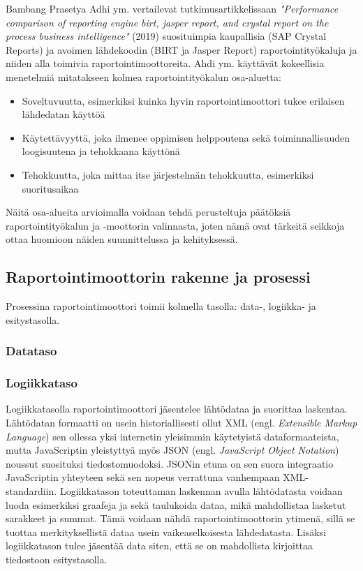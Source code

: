 Bambang Prasetya Adhi ym. vertailevat tutkimusartikkelissaan \textit{"Performance comparison of reporting engine birt, jasper report, and crystal report on the process business intelligence"} (2019)  \cite{adhi_performance_2019} suosituimpia kaupallisia (SAP Crystal Reports) ja avoimen lähdekoodin (BIRT ja Jasper Report) raportointityökaluja ja niiden alla toimivia raportointimoottoreita. Ahdi ym. käyttävät kokeellisia menetelmiä mitatakseen kolmea raportointityökalun osa-aluetta:
\begin{itemize}
\item Soveltuvuutta, esimerkiksi kuinka hyvin raportointimoottori tukee erilaisen lähdedatan käyttöä
\item Käytettävyyttä, joka ilmenee oppimisen helppoutena sekä toiminnallisuuden loogisuutena ja tehokkaana käyttönä
\item Tehokkuutta, joka mittaa itse järjestelmän tehokkuutta, esimerkiksi suoritusaikaa
\end{itemize}
Näitä osa-alueita arvioimalla voidaan tehdä perusteltuja päätöksiä raportointityökalun ja -moottorin valinnasta, joten nämä ovat tärkeitä seikkoja ottaa huomioon näiden suunnittelussa ja kehityksessä.

\subsection{Raportointimoottorin rakenne ja prosessi} \label{Raportointimoottorin rakenne ja prosessi}

Prosessina raportointimoottori toimii kolmella tasolla: data-, logiikka- ja esitystasolla. \cite{he_design_2010}

\subsubsection{Datataso}


\subsubsection{Logiikkataso}

Logiikkatasolla raportointimoottori jäsentelee lähtödataa ja suorittaa laskentaa. Lähtödatan formaatti on usein historiallisesti ollut XML (engl. \textit{Extensible Markup Language}) sen ollessa yksi internetin yleisimmin käytetyistä dataformaateista, mutta JavaScriptin yleistyttyä myös JSON (engl. \textit{JavaScript Object Notation}) noussut suosituksi tiedostomuodoksi. JSONin etuna on sen suora integraatio JavaScriptin yhteyteen sekä sen nopeus verrattuna vanhempaan XML-standardiin. \cite{nurseitov_comparison_nodate} Logiikkatason toteuttaman laskennan avulla lähtödatasta voidaan luoda esimerkiksi graafeja ja sekä taulukoida dataa, mikä mahdollistaa lasketut sarakkeet ja summat. Tämä voidaan nähdä raportointimoottorin ytimenä, sillä se tuottaa merkityksellistä dataa usein vaikeaselkoisesta lähdedatasta. \cite{he_design_2010} Lisäksi logiikkatason tulee jäsentää data siten, että se on mahdollista kirjoittaa tiedostoon esitystasolla.

